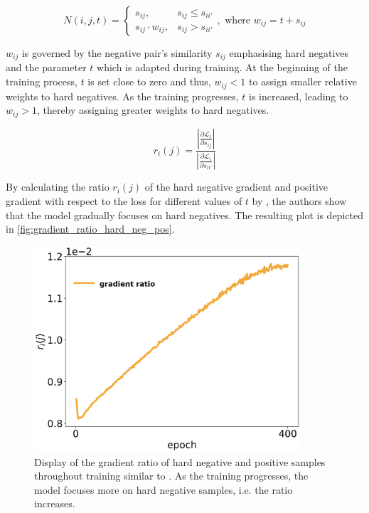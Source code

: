 \begin{equation}
    N(i,j,t) = \left\{\begin{array}{ll} s_{ij}, & s_{ij} \le s_{ii'} \\
        s_{ij} \cdot  w_{ij}, & s_{ij} > s_{ii'}\end{array}\right. ,\text{ where }w_{ij} = t + s_{ij}
    \label{eq:curricular_negative_weighting}
\end{equation}

$w_{ij}$ is governed by the negative pair's similarity $s_{ij}$ emphasising hard negatives 
and the parameter $t$ which is adapted during training.
At the beginning of the training process, $t$ is set close to zero and thus, $w_{ij} < 1$ 
to assign smaller relative weights to hard negatives.
As the training progresses, $t$ is increased, leading to $w_{ij} > 1$, 
thereby assigning greater weights to hard negatives.

\begin{equation}
    r_i(j) = \frac{\left| \frac{\partial \mathcal{L}_i}{\partial s_{ij}} \right|}
    {\left| \frac{\partial \mathcal{L}_i}{\partial s_{ii'}} \right|}
    \label{eq:curricular_weighting_ratio}
\end{equation}


By calculating the ratio $r_i(j)$ of the hard negative gradient and positive gradient 
with respect to the loss for different values of $t$ by , 
the authors show that the model gradually focuses on hard negatives.
The resulting plot is depicted in \autoref{fig:gradient_ratio_hard_neg_pos}.

\begin{figure}[!htb] %
    \centering
    \includegraphics[width=280pt]{images/ratio_hard_neg_pos_gradients_only_ratio.png}
    \caption{Display of the gradient ratio of hard negative and positive samples throughout training 
    similar to \citet{curricular_weighting_2024}.
    As the training progresses, the model focuses more on hard negative samples, i.e. the ratio increases.
    }
    \label{fig:gradient_ratio_hard_neg_pos}
\end{figure}

